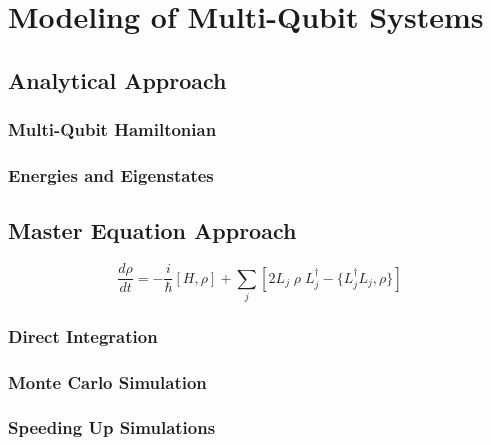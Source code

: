 \chapter{Modeling of Multi-Qubit Systems}


\section{Analytical Approach}

\subsection{Multi-Qubit Hamiltonian}


\subsection{Energies and Eigenstates}


\section{Master Equation Approach}

\begin{equation}
\frac{d\rho}{dt} = -\frac{i}{\hbar}[H,\rho]+\sum\limits_j\left[2L_j \; \rho \; L_j^\dagger -\{L_j^\dagger L_j,\rho\}\right] \label{eq:master_equation_lindblad_form}
\end{equation}


\subsection{Direct Integration}


\subsection{Monte Carlo Simulation}


\subsection{Speeding Up Simulations}


